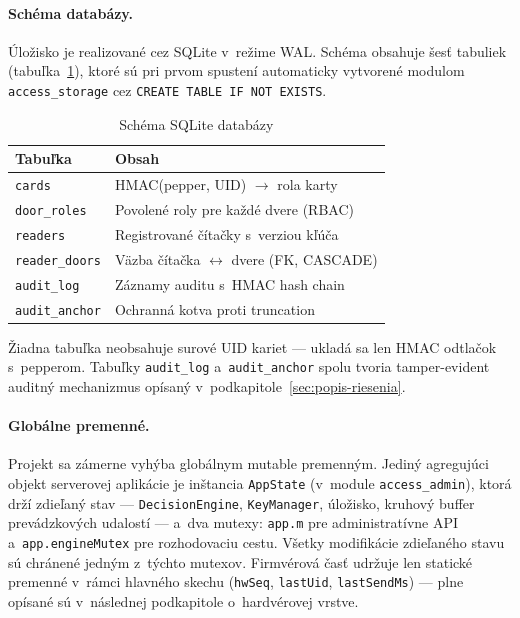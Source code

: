 \documentclass[a4paper]{feidipsp}
\begin{document}
\paragraph{Schéma databázy.}

Úložisko je realizované cez SQLite v~režime WAL. Schéma obsahuje šesť tabuliek (tabuľka~\ref{t:db-schema}), ktoré sú pri prvom spustení automaticky vytvorené modulom \texttt{access\_storage} cez \texttt{CREATE TABLE IF NOT EXISTS}.

\begin{table}[!ht]\caption{Schéma SQLite databázy}\label{t:db-schema}
\smallskip
\centering
\begin{tabular}{|l|l|} \hline
\textbf{Tabuľka} & \textbf{Obsah} \\ \hline
\texttt{cards}         & HMAC(pepper, UID) $\rightarrow$ rola karty \\ \hline
\texttt{door\_roles}   & Povolené roly pre každé dvere (RBAC) \\ \hline
\texttt{readers}       & Registrované čítačky s~verziou kľúča \\ \hline
\texttt{reader\_doors} & Väzba čítačka $\leftrightarrow$ dvere (FK, CASCADE) \\ \hline
\texttt{audit\_log}    & Záznamy auditu s~HMAC hash chain \\ \hline
\texttt{audit\_anchor} & Ochranná kotva proti truncation \\ \hline
\end{tabular}
\end{table}

Žiadna tabuľka neobsahuje surové UID kariet --- ukladá sa len HMAC odtlačok s~pepperom. Tabuľky \texttt{audit\_log} a~\texttt{audit\_anchor} spolu tvoria tamper-evident auditný mechanizmus opísaný v~podkapitole~\ref{sec:popis-riesenia}.

\paragraph{Globálne premenné.}

Projekt sa zámerne vyhýba globálnym mutable premenným. Jediný agregujúci objekt serverovej aplikácie je inštancia \texttt{AppState} (v~module \texttt{access\_admin}), ktorá drží zdieľaný stav --- \texttt{DecisionEngine}, \texttt{KeyManager}, úložisko, kruhový buffer prevádzkových udalostí --- a~dva mutexy: \texttt{app.m} pre administratívne API a~\texttt{app.engineMutex} pre rozhodovaciu cestu. Všetky modifikácie zdieľaného stavu sú chránené jedným z~týchto mutexov. Firmvérová časť udržuje len statické premenné v~rámci hlavného skechu (\texttt{hwSeq}, \texttt{lastUid}, \texttt{lastSendMs}) --- plne opísané sú v~následnej podkapitole o~hardvérovej vrstve.
\end{document}
